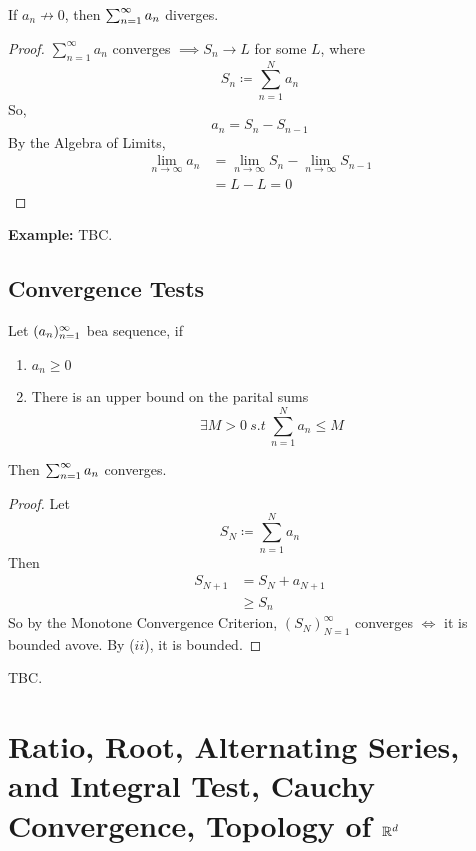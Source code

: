 \documentclass[openany]{report}
\begin{document}
\begin{prop}
    If $a_n\not\rightarrow 0$, then $\sum_{n=1}^\infty a_n$ diverges.
\end{prop}
\begin{proof}
    $\sum_{n=1}^\infty a_n$ converges $\implies S_n \rightarrow L$ for some $L$, where 
    \[S_n \coloneqq \sum_{n=1}^N a_n\]
    So, 
    \[a_n = S_n - S_{n-1}\]
    By the Algebra of Limits, 
    \begin{align*}
        \lim_{n\rightarrow \infty} a_n &= \lim_{n\rightarrow \infty} S_n - \lim_{n\rightarrow \infty} S_{n-1}\\
        &= L - L = 0
    \end{align*}
\end{proof}
\textbf{Example:} TBC.

\section{Convergence Tests}
\begin{prop}
    Let $({a}_n)_{n=1}^\infty$ bea  sequence, if 
    \begin{enumerate}[label=(\roman*)]
        \item $a_n \geq 0$
        \item There is an upper bound on the parital sums
        \[\exists M > 0 \ s.t \ \sum_{n=1}^N a_n \leq M\]
    \end{enumerate}
    Then $\sum_{n=1}^\infty a_n$ converges.
\end{prop}
\begin{proof}
    Let 
    \[S_N \coloneqq \sum_{n=1}^N a_n\]
    Then 
    \begin{align*}
        S_{N+1} &= S_N + a_{N+1}\\ 
        &\geq S_n
    \end{align*}
    So by the Monotone Convergence Criterion, $(S_N)_{N=1}^\infty$ converges $\iff$ it is bounded avove. By ($ii$), it is bounded.
\end{proof}

\begin{prop}
    TBC. 
\end{prop}

\chapter{Ratio, Root, Alternating Series, and Integral Test, Cauchy Convergence, Topology of $\mathbb{R}^d$}
\end{document}
